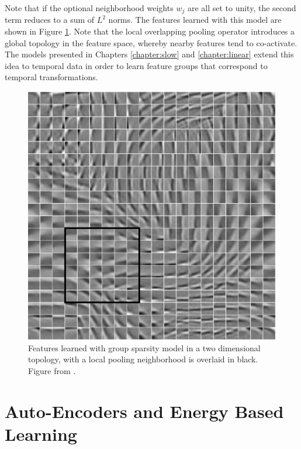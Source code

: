 Note that if the optional neighborhood weights $w_j$ are all set to unity, the
second term reduces to a sum of $L^2$ norms.  The features learned with this
model are shown in Figure \ref{fig:GSC_features}.  Note that the local
overlapping pooling operator introduces a global topology in the feature space,
whereby nearby features tend to co-activate. The models presented in Chapters
\ref{chapter:slow} and \ref{chapter:linear} extend this idea to temporal data
in order to learn feature groups that correspond to temporal transformations.    

\begin{figure} 
\centering
\includegraphics[scale=0.4]{./figures/related_work/PSD.png} 
\caption{Features learned with group sparsity model in a two dimensional topology, 
with a local pooling neighborhood is overlaid in black. Figure from \cite{groupSparsity}.}
\label{fig:GSC_features} 
\end{figure} 
 
\section{Auto-Encoders and Energy Based Learning} 

